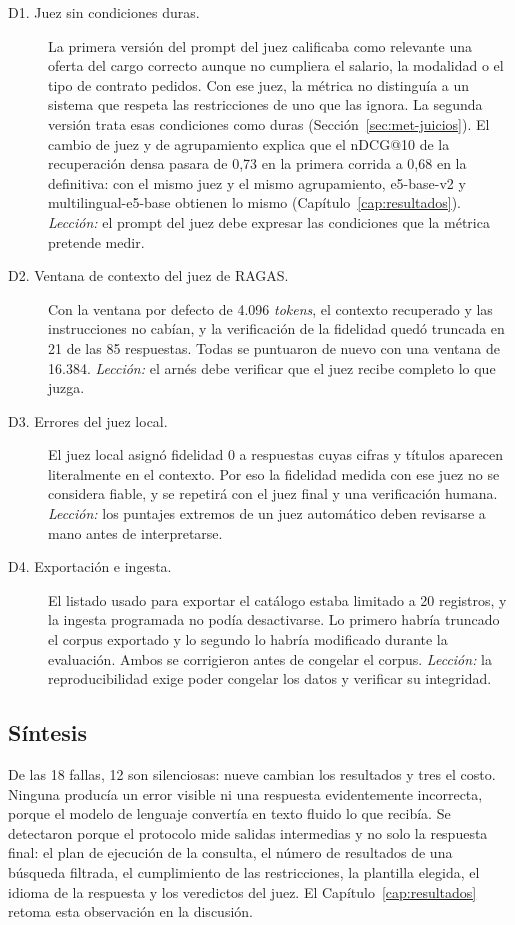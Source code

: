 \begin{description}
    \item[D1. Juez sin condiciones duras.] La primera versión del prompt del juez calificaba como relevante una oferta del cargo correcto aunque no cumpliera el salario, la modalidad o el tipo de contrato pedidos. Con ese juez, la métrica no distinguía a un sistema que respeta las restricciones de uno que las ignora. La segunda versión trata esas condiciones como duras (Sección~\ref{sec:met-juicios}). El cambio de juez y de agrupamiento explica que el nDCG@10 de la recuperación densa pasara de 0,73 en la primera corrida a 0,68 en la definitiva: con el mismo juez y el mismo agrupamiento, e5-base-v2 y multilingual-e5-base obtienen lo mismo (Capítulo~\ref{cap:resultados}). \emph{Lección:} el prompt del juez debe expresar las condiciones que la métrica pretende medir.
    \item[D2. Ventana de contexto del juez de RAGAS.] Con la ventana por defecto de 4.096 \textit{tokens}, el contexto recuperado y las instrucciones no cabían, y la verificación de la fidelidad quedó truncada en 21 de las 85 respuestas. Todas se puntuaron de nuevo con una ventana de 16.384. \emph{Lección:} el arnés debe verificar que el juez recibe completo lo que juzga.
    \item[D3. Errores del juez local.] El juez local asignó fidelidad 0 a respuestas cuyas cifras y títulos aparecen literalmente en el contexto. Por eso la fidelidad medida con ese juez no se considera fiable, y se repetirá con el juez final y una verificación humana. \emph{Lección:} los puntajes extremos de un juez automático deben revisarse a mano antes de interpretarse.
    \item[D4. Exportación e ingesta.] El listado usado para exportar el catálogo estaba limitado a 20 registros, y la ingesta programada no podía desactivarse. Lo primero habría truncado el corpus exportado y lo segundo lo habría modificado durante la evaluación. Ambos se corrigieron antes de congelar el corpus. \emph{Lección:} la reproducibilidad exige poder congelar los datos y verificar su integridad.
\end{description}

\subsection{Síntesis}

De las 18 fallas, 12 son silenciosas: nueve cambian los resultados y tres el costo. Ninguna producía un error visible ni una respuesta evidentemente incorrecta, porque el modelo de lenguaje convertía en texto fluido lo que recibía. Se detectaron porque el protocolo mide salidas intermedias y no solo la respuesta final: el plan de ejecución de la consulta, el número de resultados de una búsqueda filtrada, el cumplimiento de las restricciones, la plantilla elegida, el idioma de la respuesta y los veredictos del juez. El Capítulo~\ref{cap:resultados} retoma esta observación en la discusión.
